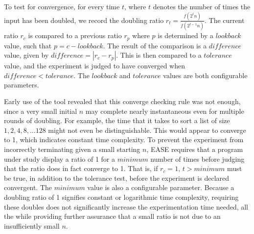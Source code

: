 \documentclass[10pt,twocolumn]{article}
\newcommand{\toolname}{{\sc EASE}\xspace}
\begin{document}
  To test for convergence, for every time $t$, where $t$ denotes the number of times the input has been doubled, we
  record the doubling ratio $r_t = \frac{f(2^t n)}{f(2^{t-1}n)}$. The current ratio $r_c$ is compared to a previous
  ratio $r_p$ where $p$ is determined by a $\mathit{lookback}$ value, such that $p=c-\mathit{lookback}$.  The result of
  the comparison is a $\mathit{difference}$ value, given by $\mathit{difference} = |r_c - r_p|$.  This is then compared
  to a $\mathit{tolerance}$ value, and the experiment is judged to have converged when $\mathit{difference}<\mathit{tolerance}$.
  The $\mathit{lookback}$ and $\mathit{tolerance}$ values are both configurable parameters.

  Early use of the tool revealed that this converge checking rule was
  not enough, since a very small initial $n$ may complete nearly
  instantaneous even for multiple rounds of doubling.  For example, the
  time that it takes to sort a list of size $1, 2, 4, 8, \dots 128$
  might not even be distinguishable. This would appear to converge to 1, which 
  indicates constant time complexity. To prevent the experiment from incorrectly terminating
  given a small starting $n$, \toolname requires that a program under study display a ratio of 1 for a
  $\mathit{minimum}$ number of times before judging that the ratio does in fact converge to 1.  That is, if $r_c = 1$,
  $t > \mathit{minimum}$ must be true, in addition to the tolerance test, before the experiment is declared convergent.
  The $\mathit{minimum}$ value is also a configurable parameter.  Because a doubling ratio of 1 signifies
  constant or logarithmic time complexity, requiring these doubles does not significantly increase the experimentation
  time needed, all the while providing further assurance that a small ratio is not due to an insufficiently small $n$.

\end{document}
